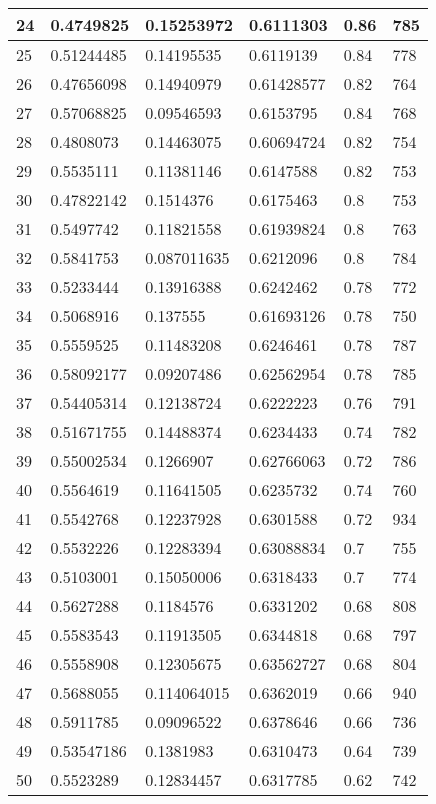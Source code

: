 \begin{longtable}{|l|l|l|l|l|l|}
24 & 0.4749825 & 0.15253972 & 0.6111303 & 0.86 & 785 \\ \hline 
25 & 0.51244485 & 0.14195535 & 0.6119139 & 0.84 & 778 \\ \hline 
26 & 0.47656098 & 0.14940979 & 0.61428577 & 0.82 & 764 \\ \hline 
27 & 0.57068825 & 0.09546593 & 0.6153795 & 0.84 & 768 \\ \hline 
28 & 0.4808073 & 0.14463075 & 0.60694724 & 0.82 & 754 \\ \hline 
29 & 0.5535111 & 0.11381146 & 0.6147588 & 0.82 & 753 \\ \hline 
30 & 0.47822142 & 0.1514376 & 0.6175463 & 0.8 & 753 \\ \hline 
31 & 0.5497742 & 0.11821558 & 0.61939824 & 0.8 & 763 \\ \hline 
32 & 0.5841753 & 0.087011635 & 0.6212096 & 0.8 & 784 \\ \hline 
33 & 0.5233444 & 0.13916388 & 0.6242462 & 0.78 & 772 \\ \hline 
34 & 0.5068916 & 0.137555 & 0.61693126 & 0.78 & 750 \\ \hline 
35 & 0.5559525 & 0.11483208 & 0.6246461 & 0.78 & 787 \\ \hline 
36 & 0.58092177 & 0.09207486 & 0.62562954 & 0.78 & 785 \\ \hline 
37 & 0.54405314 & 0.12138724 & 0.6222223 & 0.76 & 791 \\ \hline 
38 & 0.51671755 & 0.14488374 & 0.6234433 & 0.74 & 782 \\ \hline 
39 & 0.55002534 & 0.1266907 & 0.62766063 & 0.72 & 786 \\ \hline 
40 & 0.5564619 & 0.11641505 & 0.6235732 & 0.74 & 760 \\ \hline 
41 & 0.5542768 & 0.12237928 & 0.6301588 & 0.72 & 934 \\ \hline 
42 & 0.5532226 & 0.12283394 & 0.63088834 & 0.7 & 755 \\ \hline 
43 & 0.5103001 & 0.15050006 & 0.6318433 & 0.7 & 774 \\ \hline 
44 & 0.5627288 & 0.1184576 & 0.6331202 & 0.68 & 808 \\ \hline 
45 & 0.5583543 & 0.11913505 & 0.6344818 & 0.68 & 797 \\ \hline 
46 & 0.5558908 & 0.12305675 & 0.63562727 & 0.68 & 804 \\ \hline 
47 & 0.5688055 & 0.114064015 & 0.6362019 & 0.66 & 940 \\ \hline 
48 & 0.5911785 & 0.09096522 & 0.6378646 & 0.66 & 736 \\ \hline 
49 & 0.53547186 & 0.1381983 & 0.6310473 & 0.64 & 739 \\ \hline 
50 & 0.5523289 & 0.12834457 & 0.6317785 & 0.62 & 742 \\ \hline 
\end{longtable}